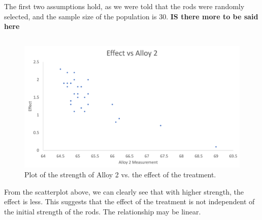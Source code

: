 \documentclass[letterpaper]{article}
\begin{document}
The first two assumptions hold, as we were told that the
rods were randomly selected, and the sample size of the population is 30.
\textbf{IS there more to be said here}

\subsection{}%
%

\begin{figure}[H]
 \centering
 \includegraphics[width=\textwidth]{q6.png}
 \caption{Plot of the strength of Alloy 2 vs. the effect of the treatment.}
 \label{q6}
\end{figure}

From the scatterplot above, we can clearly see that with higher strength, the effect
is less. This suggests that the effect of the treatment is not independent of the initial strength of the rods. The relationship may be linear.
\end{document}
